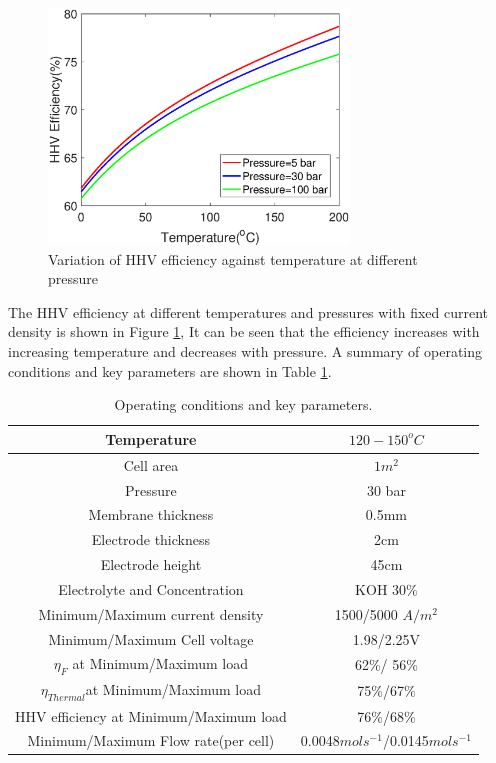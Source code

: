 \documentclass[11pt, a4paper]{article}
\begin{document}
\begin{figure}[H]
\centering
\includegraphics[width=8cm]{HHV.eps}
\caption{Variation of HHV efficiency against temperature at different pressure}
\label{fig:HHV}
\end{figure} 
The HHV efficiency at different temperatures and pressures with fixed current density is shown in Figure \ref{fig:HHV}, It can be seen that the efficiency increases with increasing temperature and decreases with pressure. A summary of operating conditions and key parameters are shown in Table \ref{tab:oo}.

\begin{table}
\centering
\begin{tabular}{ |c|c| } 
 \hline
 Temperature & $120 - 150 ^oC$  \\ 
 \hline
 Cell area & $1m^2$\\
 \hline
 Pressure & 30 bar \\
 \hline
 Membrane thickness & 0.5mm\\ 
 \hline
 Electrode thickness & 2cm\\
 \hline
 Electrode height & 45cm\\
 \hline
 Electrolyte and Concentration & KOH $30\%$\\
 \hline
 Minimum/Maximum current density & 1500/5000 $A/m^2$\\
 \hline
 Minimum/Maximum Cell voltage & 1.98/2.25V \\ 
 \hline
 $\eta_F$ at Minimum/Maximum load & 62\%/ 56\% \\ 

 \hline
 $\eta_{Thermal}$at Minimum/Maximum load & 75\%/67\% \\ 
 \hline
 HHV efficiency at Minimum/Maximum load &  76\%/68\% \\ 
 \hline
 Minimum/Maximum Flow rate(per cell) & 0.0048$mols^{-1}$/0.0145$mols^{-1}$\\
 \hline
\end{tabular}
\caption{\label{tab:oo}Operating conditions and key parameters.}
\end{table}
\end{document}
